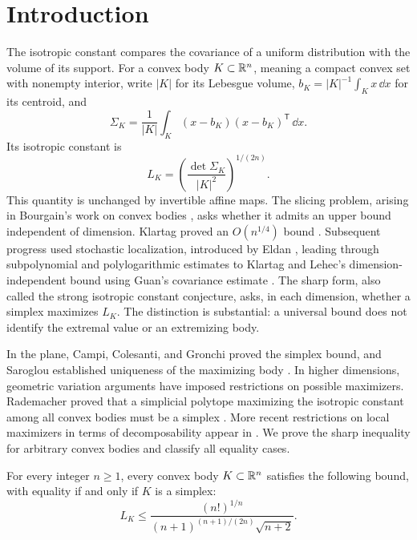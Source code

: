 \section{Introduction}

The isotropic constant compares the covariance of a uniform distribution
with the volume of its support.  For a convex body $K\subset\mathbb R^n$,
meaning a compact convex set with nonempty interior, write $|K|$ for its
Lebesgue volume, $b_K=|K|^{-1}\int_Kx\,\dd x$ for its centroid, and
\[
 \Sigma_K=\frac1{|K|}\int_K(x-b_K)(x-b_K)^{\mathsf T}\,\dd x.
\]
Its isotropic constant is
\begin{equation}\label{intro:isotropic-constant}
 L_K=\left(\frac{\det\Sigma_K}{|K|^2}\right)^{1/(2n)}.
\end{equation}
This quantity is unchanged by invertible affine maps.  The slicing
problem, arising in Bourgain's work on convex bodies
\cite{Bourgain1986}, asks whether it admits an upper bound independent
of dimension.  Klartag proved an $O(n^{1/4})$ bound
\cite{Klartag2006}.  Subsequent progress used stochastic localization,
introduced by Eldan \cite{Eldan2013}, leading through subpolynomial
and polylogarithmic estimates \cite{Chen2021,KlartagLehec2022,Klartag2023}
to Klartag and Lehec's dimension-independent bound using Guan's
covariance estimate \cite{Guan2024,KlartagLehec2025}.
The sharp form, also called the strong isotropic constant conjecture,
asks, in each dimension, whether a simplex maximizes $L_K$.
The distinction is substantial: a universal bound does not
identify the extremal value or an extremizing body.

In the plane, Campi, Colesanti, and Gronchi proved the simplex bound,
and Saroglou established uniqueness of the maximizing body
\cite{CampiColesantiGronchi1999,Saroglou2010}.
In higher dimensions, geometric variation arguments have imposed
restrictions on possible maximizers.  Rademacher proved that a
simplicial polytope maximizing the isotropic constant among all convex
bodies must be a simplex \cite{Rademacher2016}. More recent restrictions on local
maximizers in terms of decomposability appear in \cite{Kipp2026}.
We prove the sharp inequality for arbitrary convex bodies and classify
all equality cases.

\begin{theorem}\label{intro:simplex}
For every integer $n\ge1$, every convex body $K\subset\mathbb R^n$ satisfies
the following bound, with equality if and only if $K$ is a simplex:
\begin{equation}\label{intro:simplex-bound}
 L_K\le
 \frac{(n!)^{1/n}}{(n+1)^{(n+1)/(2n)}\sqrt{n+2}}.
\end{equation}
\end{theorem}

